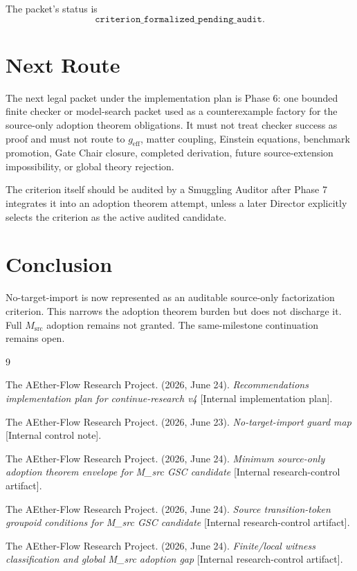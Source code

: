 \documentclass[11pt]{article}
\newcommand{\Msrc}{M_{\mathrm{src}}}
\newcommand{\geff}{g_{\mathrm{eff}}}
\begin{document}
The packet's status is
\[
  \texttt{criterion\_formalized\_pending\_audit}.
\]

\section{Next Route}

The next legal packet under the implementation plan is Phase 6: one bounded
finite checker or model-search packet used as a counterexample factory for the
source-only adoption theorem obligations. It must not treat checker success as
proof and must not route to \(\geff\), matter coupling, Einstein equations,
benchmark promotion, Gate Chair closure, completed derivation, future
source-extension impossibility, or global theory rejection.

The criterion itself should be audited by a Smuggling Auditor after Phase 7
integrates it into an adoption theorem attempt, unless a later Director
explicitly selects the criterion as the active audited candidate.

\section{Conclusion}

No-target-import is now represented as an auditable source-only factorization
criterion. This narrows the adoption theorem burden but does not discharge it.
Full \(\Msrc\) adoption remains not granted. The same-milestone continuation
remains open.

\begin{thebibliography}{9}

The AEther-Flow Research Project. (2026, June 24). \emph{Recommendations
implementation plan for continue-research v4} [Internal implementation plan].

The AEther-Flow Research Project. (2026, June 23). \emph{No-target-import
guard map} [Internal control note].

The AEther-Flow Research Project. (2026, June 24). \emph{Minimum source-only
adoption theorem envelope for M\_src GSC candidate} [Internal research-control
artifact].

The AEther-Flow Research Project. (2026, June 24). \emph{Source transition-token
groupoid conditions for M\_src GSC candidate} [Internal research-control
artifact].

The AEther-Flow Research Project. (2026, June 24). \emph{Finite/local witness
classification and global M\_src adoption gap} [Internal research-control
artifact].

\end{thebibliography}
\end{document}
